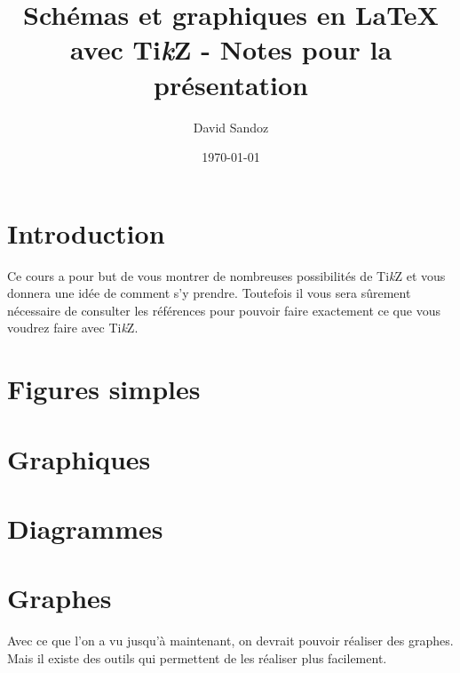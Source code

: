 \documentclass[11pt]{article}
\newcommand{\TikZ}{Ti\textit{k}Z}
\begin{document}
\title{Schémas et graphiques en \LaTeX{} avec \TikZ{} - Notes pour la présentation}
\author{David Sandoz}
\date{\today}
\maketitle

\section{Introduction}
Ce cours a pour but de vous montrer de nombreuses possibilités de \TikZ{} et vous donnera une idée de comment s'y prendre. Toutefois il vous sera sûrement nécessaire de consulter les références pour pouvoir faire exactement ce que vous voudrez faire avec \TikZ.

\section{Figures simples}

\section{Graphiques}

\section{Diagrammes}

\section{Graphes}
Avec ce que l'on a vu jusqu'à maintenant, on devrait pouvoir réaliser des graphes. Mais il existe des outils qui permettent de les réaliser plus facilement.
\end{document}
